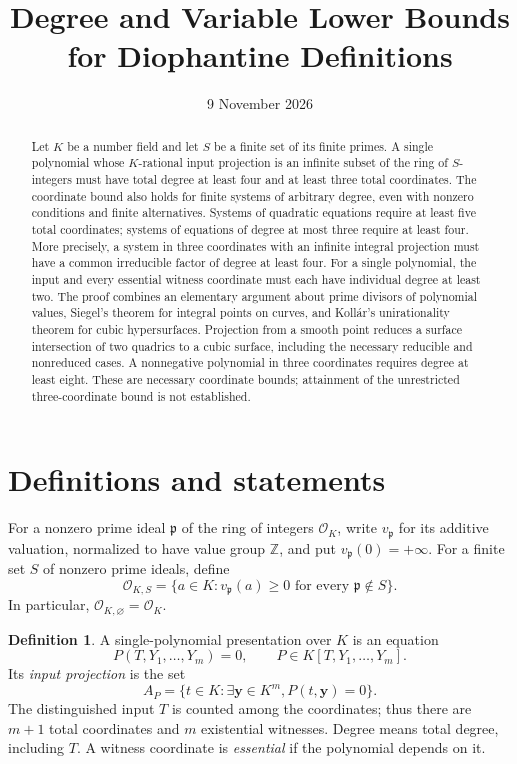 \documentclass[11pt,a4paper]{article}
\title{Degree and Variable Lower Bounds\\for Diophantine Definitions}
\author{}
\date{9 November 2026}
\theoremstyle{definition}
\newtheorem{definition}[theorem]{Definition}
\newcommand{\OKS}{\mathcal O_{K,S}}
\begin{document}
\maketitle
\begin{abstract}
Let $K$ be a number field and let $S$ be a finite set of its finite
primes. A single polynomial whose $K$-rational input projection is
an infinite subset of the ring of $S$-integers must have total
degree at least four and at least three total coordinates. The
coordinate bound also holds for finite systems of arbitrary degree,
even with nonzero conditions and finite alternatives. Systems of
quadratic equations require at least five total coordinates; systems
of equations of degree at most three require at least four. More
precisely, a system in three coordinates with an
infinite integral projection must have a common irreducible factor
of degree at least four. For a single polynomial, the input and every essential witness coordinate must
each have individual degree at least two. The proof combines an
elementary argument about prime divisors of polynomial values,
Siegel's theorem for integral points on curves, and Koll\'ar's
unirationality theorem for cubic hypersurfaces. Projection from a
smooth point reduces a surface intersection of two quadrics to a
cubic surface, including the necessary reducible and nonreduced
cases. A nonnegative polynomial in three coordinates requires
degree at least eight. These are necessary coordinate bounds;
attainment of the unrestricted three-coordinate bound is not established.
\end{abstract}

\section{Definitions and statements}

For a nonzero prime ideal $\mathfrak p$ of the ring of integers
$\mathcal O_K$, write $v_{\mathfrak p}$ for its additive valuation,
normalized to have value group $\mathbb Z$, and put
$v_{\mathfrak p}(0)=+\infty$. For a finite set $S$ of nonzero
prime ideals, define
\[
 \OKS=\{a\in K: v_{\mathfrak p}(a)\ge0
                       \text{ for every }\mathfrak p\notin S\}.
\]
In particular, $\mathcal O_{K,\varnothing}=\mathcal O_K$.

\begin{definition}
A single-polynomial presentation over $K$ is an equation
\[
                P(T,Y_1,\ldots,Y_m)=0,
       \qquad P\in K[T,Y_1,\ldots,Y_m].
\]
Its \emph{input projection} is the set
\[
 A_P=\{t\in K:\exists \mathbf y\in K^m, P(t,\mathbf y)=0\}.
\]
The distinguished input $T$ is counted among the coordinates; thus
there are $m+1$ total coordinates and $m$ existential witnesses.
Degree means total degree, including $T$. A witness coordinate is
\emph{essential} if the polynomial depends on it.
\end{definition}
\end{document}
